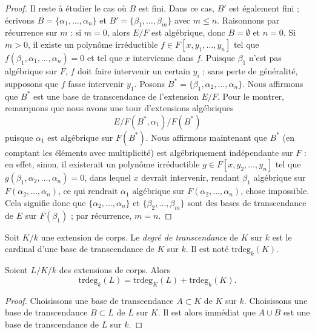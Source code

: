 \begin{proof}
\medskip\noindent
Il reste à étudier le cas où $B$ est fini.
Dans ce cas, $B'$ est également fini ; écrivons
$B = \{\alpha_1, \ldots, \alpha_n\}$ et
$B' = \{\beta_1, \ldots, \beta_m\}$ avec $m \leq n$.
Raisonnons par récurrence sur $m$ : si $m = 0$, alors $E/F$ est algébrique, donc
$B = \emptyset$ et $n = 0$. Si $m > 0$, il existe un polynôme irréductible
$f \in F[x, y_1, \ldots, y_n]$ tel que
$f(\beta_1, \alpha_1, \ldots, \alpha_n) = 0$ et tel que $x$ intervienne dans $f$.
Puisque $\beta_1$ n'est pas algébrique sur $F$, $f$ doit faire intervenir un certain $y_i$ ;
sans perte de généralité, supposons que $f$ fasse intervenir $y_1$.
Posons $B^* = \{\beta_1, \alpha_2, \ldots, \alpha_n\}$.
Nous affirmons que $B^*$ est une base de transcendance de l'extension $E/F$. Pour le montrer, remarquons que
nous avons une tour d'extensions algébriques
$$
E/ F(B^*, \alpha_1) / F(B^*)
$$
puisque $\alpha_1$ est algébrique sur $F(B^*)$.
Nous affirmons maintenant que $B^*$ (en comptant les éléments avec multiplicité) est
algébriquement indépendante sur $F$ : en effet, sinon, il existerait un
polynôme irréductible $g\in F[x, y_2, \ldots, y_n]$ tel que
$g(\beta_1, \alpha_2, \ldots, \alpha_n) = 0$,
dans lequel $x$ devrait intervenir, rendant $\beta_1$
algébrique sur $F(\alpha_2, \ldots, \alpha_n)$, ce qui rendrait $\alpha_1$
algébrique sur $F(\alpha_2, \ldots, \alpha_n)$, chose impossible.
Cela signifie donc que $\{\alpha_2, \ldots, \alpha_n\}$ et
$\{\beta_2, \ldots, \beta_m\}$ sont des bases de transcendance de $E$ sur $F(\beta_1)$ ;
par récurrence, $m = n$.
\end{proof}

\begin{definition}
\label{definition-transcendence-degree}
Soit $K/k$ une extension de corps.
Le {\it degré de transcendance} de $K$ sur $k$ est
le cardinal d'une base de transcendance de $K$ sur $k$.
Il est noté $\text{trdeg}_k(K)$.
\end{definition}

\begin{lemma}
\label{lemma-transcendence-degree-tower}
Soient $L/K/k$ des extensions de corps.
Alors
$$
\text{trdeg}_k(L) =
\text{trdeg}_K(L) +
\text{trdeg}_k(K).
$$
\end{lemma}

\begin{proof}
Choisissons une base de transcendance $A \subset K$ de $K$ sur $k$.
Choisissons une base de transcendance $B \subset L$ de $L$ sur $K$.
Il est alors immédiat que $A \cup B$ est une base de transcendance
de $L$ sur $k$.
\end{proof}

